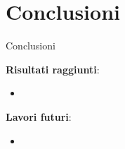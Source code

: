 
\section{Conclusioni}

\begin{frame}{Conclusioni}

    \textbf{Risultati raggiunti}:
    \begin{itemize}
        \item 
    \end{itemize}

    \vspace{3mm}

    \textbf{Lavori futuri}:
    \begin{itemize}
        \item 
    \end{itemize}
    
\end{frame}